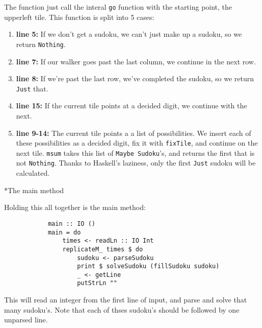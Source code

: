 \documentclass[a4paper,12pt]{article}
\begin{document}
\begin{section}
\begin{subsection}
\begin{subsubsection}
            The function just call the interal \texttt{go} function with the
            starting point, the upperleft tile. This function is split into 5
            cases:
            \begin{enumerate}
                \item \textbf{line 5:} If we don't get a sudoku, we can't just
                    make up a sudoku, so we return \texttt{Nothing}.
                \item \textbf{line 7:} If our walker goes past the last column,
                    we continue in the next row.
                \item \textbf{line 8:} If we're past the last row, we've
                    completed the sudoku, so we return \texttt{Just} that.
                \item \textbf{line 15:} If the current tile points at a decided
                    digit, we continue with the next.
                \item \textbf{line 9-14:} The current tile points a a list of
                    possibilities. We insert each of these possibilities as a
                    decided digit, fix it with \texttt{fixTile}, and continue on
                    the next tile. \texttt{msum} takes this list of
                    \texttt{Maybe Sudoku}'s, and returns the first that is not
                    \texttt{Nothing}. Thanks to Haskell's laziness, only the
                    first \texttt{Just} sudoku will be calculated.
            \end{enumerate}
            
        \end{subsubsection}

        
        \begin{subsubsection}*{The main method}

            Holding this all together is the main method:
            \begin{lstlisting}
            main :: IO ()
            main = do
                times <- readLn :: IO Int
                replicateM_ times $ do
                    sudoku <- parseSudoku
                    print $ solveSudoku (fillSudoku sudoku)
                    _ <- getLine
                    putStrLn ""
            \end{lstlisting}

            This will read an integer from the first line of input, and parse
            and solve that many sudoku's. Note that each of thses sudoku's
            should be followed by one unparsed line.


\end{subsubsection}
\end{subsection}
\end{section}
\end{document}
